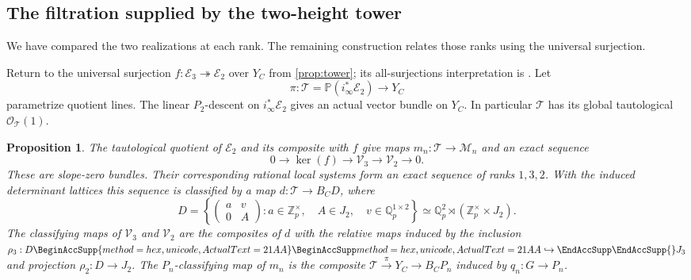 \documentclass[11pt]{article}
\numberwithin{equation}{section}
\newtheorem{proposition}[theorem]{Proposition}
\theoremstyle{definition}
\theoremstyle{remark}
\newcommand{\Q}{\mathbb Q}
\newcommand{\Z}{\mathbb Z}
\newcommand{\cO}{\mathcal O}
\let\UnicodeOriginalHookrightarrow\hookrightarrow
\DeclareRobustCommand{\hookrightarrow}{
  \BeginAccSupp{method=hex,unicode,ActualText=21AA}
  \UnicodeOriginalHookrightarrow\EndAccSupp{}}
\begin{document}
\subsection{The filtration supplied by the two-height tower}

We have compared the two realizations at each rank. The remaining
construction relates those ranks using the universal surjection.

Return to the universal surjection
$f:\mathcal E_3\twoheadrightarrow\mathcal E_2$ over $Y_C$ from
\cref{prop:tower}; its all-surjections interpretation is
\cite[Proposition 2.7.1(3)]{BMR2026}.
Let
\[
 \pi:\mathcal T=\mathbb P(i_\infty^*\mathcal E_2)\longrightarrow Y_C
\]
parametrize quotient lines.  The linear $P_2$-descent on
$i_\infty^*\mathcal E_2$ gives an actual vector bundle on $Y_C$.
In particular $\mathcal T$ has its global tautological
$\cO_{\mathcal T}(1)$.

\begin{proposition}\label{prop:filtered-modification}
The tautological quotient of $\mathcal E_2$ and its composite with $f$
give maps $m_n:\mathcal T\to\mathcal M_n$ and an exact sequence
\begin{equation}\label{eq:filtered-modification}
 0\longrightarrow\ker(f)\longrightarrow\mathcal V_3
       \longrightarrow\mathcal V_2\longrightarrow0 .
\end{equation}
These are slope-zero bundles.  Their corresponding rational local
systems form an exact sequence of ranks $1,3,2$.
With the induced determinant lattices this sequence is classified by
a map $d:\mathcal T\to B_CD$, where
\[
 D=\left\{
 \begin{pmatrix}a&v\\0&A\end{pmatrix}:
       a\in\Z_p^\times,\quad A\in J_2,\quad v\in\Q_p^{1\times2}
       \right\}
   \simeq\Q_p^2\rtimes(\Z_p^\times\times J_2).
\]
The classifying maps of $\mathcal V_3$ and $\mathcal V_2$ are the
composites of $d$ with the relative maps induced by the inclusion
$\rho_3:D\hookrightarrow J_3$ and projection $\rho_2:D\to J_2$.
The $P_n$-classifying map of $m_n$ is the composite
$\mathcal T\xrightarrow{\pi}Y_C\to B_CP_n$ induced by
$q_n:G\to P_n$.
\end{proposition}
\end{document}
